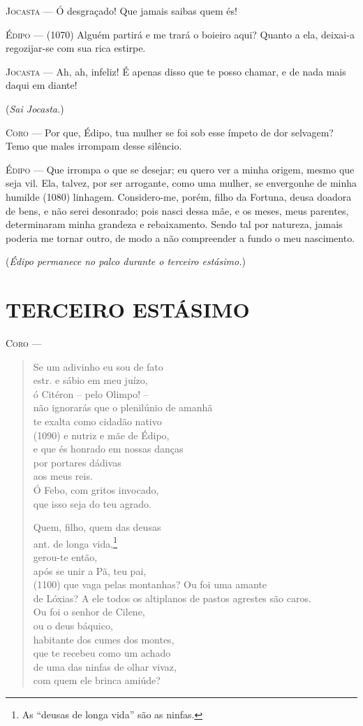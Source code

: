 \textsc{Jocasta} --- Ó desgraçado! Que jamais saibas quem és!

\textsc{Édipo} --- (1070) Alguém partirá e me trará o boieiro aqui? Quanto a ela, deixai-a
regozijar-se com sua rica estirpe.

\textsc{Jocasta} --- Ah, ah, infeliz! É apenas disso que te posso chamar, e de nada mais
daqui em diante!

(\emph{Sai Jocasta.})

\textsc{Coro} --- Por que, Édipo, tua mulher se foi sob esse ímpeto de dor selvagem? Temo
que males irrompam desse silêncio.

\textsc{Édipo} --- Que irrompa o que se desejar; eu quero ver a minha origem, mesmo que
seja vil. Ela, talvez, por ser arrogante, como uma mulher, se envergonhe
de minha humilde (1080) linhagem. Considero-me, porém, filho da Fortuna,
deusa doadora de bens, e não serei desonrado; pois nasci dessa mãe, e os
meses, meus parentes, determinaram minha grandeza e rebaixamento. Sendo
tal por natureza, jamais poderia me tornar outro, de modo a não
compreender a fundo o meu nascimento.

(\emph{Édipo permanece no palco durante o terceiro estásimo.})

\section{TERCEIRO ESTÁSIMO}

\textsc{Coro} --- \begin{verse}Se um adivinho eu sou de fato\\ estr.
e sábio em meu juízo,\\
ó Citéron -- pelo Olimpo! --\\
não ignorarás que o plenilúnio de amanhã\\
te exalta como cidadão nativo\\ (1090)
e nutriz e mãe de Édipo,\\
e que és honrado em nossas danças\\
por portares dádivas\\
aos meus reis.\\
Ó Febo, com gritos invocado,\\
que isso seja do teu agrado.

Quem, filho, quem das deusas\\ ant.
de longa vida,\footnote{As ``deusas de longa vida'' são as ninfas.}\\
gerou-te então,\\
após se unir a Pã, teu pai,\\ (1100)
que vaga pelas montanhas? Ou foi uma amante\\
de Lóxias? A ele todos os altiplanos de pastos agrestes são caros.\\
Ou foi o senhor de Cilene,\\
ou o deus báquico,\\
habitante dos cumes dos montes,\\
que te recebeu como um achado\\
de uma das ninfas de olhar vivaz,\\
com quem ele brinca amiúde?
\end{verse}


